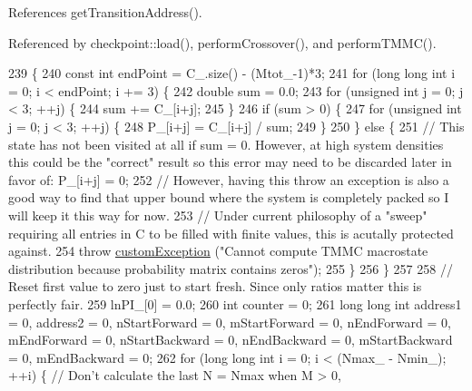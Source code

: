 References get\-Transition\-Address().



Referenced by checkpoint\-::load(), perform\-Crossover(), and perform\-T\-M\-M\-C().


\begin{DoxyCode}
239                         \{
240     \textcolor{keyword}{const} \textcolor{keywordtype}{int} endPoint = C\_.size() - (Mtot\_-1)*3;
241     \textcolor{keywordflow}{for} (\textcolor{keywordtype}{long} \textcolor{keywordtype}{long} \textcolor{keywordtype}{int} i = 0; i < endPoint; i += 3) \{
242         \textcolor{keywordtype}{double} sum = 0.0;
243         \textcolor{keywordflow}{for} (\textcolor{keywordtype}{unsigned} \textcolor{keywordtype}{int} j = 0; j < 3; ++j) \{
244             sum += C\_[i+j];
245         \}
246         \textcolor{keywordflow}{if} (sum > 0) \{
247             \textcolor{keywordflow}{for} (\textcolor{keywordtype}{unsigned} \textcolor{keywordtype}{int} j = 0; j < 3; ++j) \{
248                 P\_[i+j] = C\_[i+j] / sum;
249             \}
250         \} \textcolor{keywordflow}{else} \{
251             \textcolor{comment}{// This state has not been visited at all if sum = 0.  However, at high system densities this
       could be the "correct" result so this error may need to be discarded later in favor of: P\_[i+j] = 0;}
252             \textcolor{comment}{// However, having this throw an exception is also a good way to find that upper bound where
       the system is completely packed so I will keep it this way for now.}
253             \textcolor{comment}{// Under current philosophy of a "sweep" requiring all entries in C to be filled with finite
       values, this is acutally protected against.}
254             \textcolor{keywordflow}{throw} \hyperlink{classcustom_exception}{customException} (\textcolor{stringliteral}{"Cannot compute TMMC macrostate distribution because
       probability matrix contains zeros"});
255         \}
256     \}
257 
258     \textcolor{comment}{// Reset first value to zero just to start fresh. Since only ratios matter this is perfectly fair.}
259     lnPI\_[0] = 0.0;
260     \textcolor{keywordtype}{int} counter = 0;
261     \textcolor{keywordtype}{long} \textcolor{keywordtype}{long} \textcolor{keywordtype}{int} address1 = 0, address2 = 0, nStartForward = 0, mStartForward = 0, nEndForward = 0, 
      mEndForward = 0, nStartBackward = 0, nEndBackward = 0, mStartBackward = 0, mEndBackward = 0;
262     \textcolor{keywordflow}{for} (\textcolor{keywordtype}{long} \textcolor{keywordtype}{long} \textcolor{keywordtype}{int} i = 0; i < (Nmax\_ - Nmin\_); ++i) \{ \textcolor{comment}{// Don't calculate the last N = Nmax when M > 0,
}
\end{DoxyCode}
